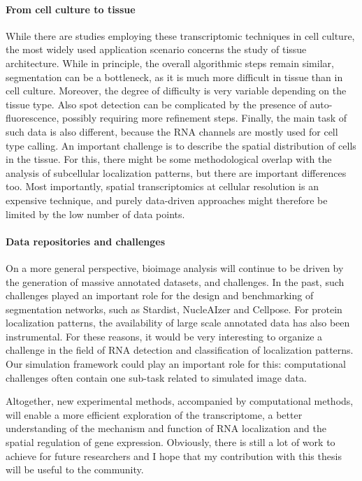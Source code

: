 \paragraph{From cell culture to tissue}
While there are studies employing these transcriptomic techniques in cell culture, the most widely used application scenario concerns the study of tissue architecture.
While in principle, the overall algorithmic steps remain similar, segmentation can be a bottleneck, as it is much more difficult in tissue than in cell culture.
Moreover, the degree of difficulty is very variable depending on the tissue type.
Also spot detection can be complicated by the presence of auto-fluorescence, possibly requiring more refinement steps.
Finally, the main task of such data is also different, because the \ac{RNA} channels are mostly used for cell type calling.
An important challenge is to describe the spatial distribution of cells in the tissue.
For this, there might be some methodological overlap with the analysis of subcellular localization patterns, but there are important differences too.
Most importantly, spatial transcriptomics at cellular resolution is an expensive technique, and purely data-driven approaches might therefore be limited by the low number of data points.

\paragraph{Data repositories and challenges}
On a more general perspective, bioimage analysis will continue to be driven by the generation of massive annotated datasets, and challenges.
In the past, such challenges played an important role for the design and benchmarking of segmentation networks, such as Stardist, NucleAIzer and Cellpose.
For protein localization patterns, the availability of large scale annotated data has also been instrumental.
For these reasons, it would be very interesting to organize a challenge in the field of \ac{RNA} detection and classification of localization patterns.
Our simulation framework could play an important role for this: computational challenges often contain one sub-task related to simulated image data.

Altogether, new experimental methods, accompanied by computational methods, will enable a more efficient exploration of the transcriptome, a better understanding of the mechanism and function of \ac{RNA} localization and the spatial regulation of gene expression.
Obviously, there is still a lot of work to achieve for future researchers and I hope that my contribution with this thesis will be useful to the community.

